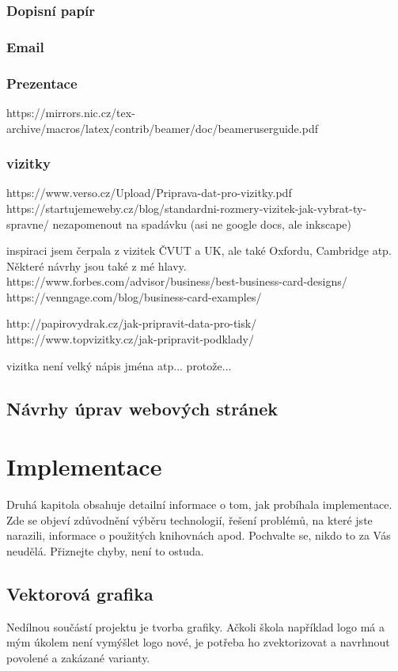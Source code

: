 \documentclass[11pt,a4paper,twoside,openright]{report}
\begin{document}
\subsection{Dopisní papír}
\subsection{Email}
\subsection{Prezentace}
https://mirrors.nic.cz/tex-archive/macros/latex/contrib/beamer/doc/beameruserguide.pdf
\subsection{vizitky}
https://www.verso.cz/Upload/Priprava-dat-pro-vizitky.pdf
https://startujemeweby.cz/blog/standardni-rozmery-vizitek-jak-vybrat-ty-spravne/
nezapomenout na spadávku (asi ne google docs, ale inkscape)

inspiraci jsem čerpala z vizitek ČVUT a UK, ale také Oxfordu, Cambridge atp. Některé návrhy jsou také z mé hlavy.
https://www.forbes.com/advisor/business/best-business-card-designs/
https://venngage.com/blog/business-card-examples/

http://papirovydrak.cz/jak-pripravit-data-pro-tisk/
https://www.topvizitky.cz/jak-pripravit-podklady/

vizitka není velký nápis jména atp... protože...
\section{Návrhy úprav webových stránek}



\chapter{Implementace}

Druhá kapitola obsahuje detailní informace o tom, jak probíhala implementace. Zde se objeví zdůvodnění výběru technologií, řešení problémů, na které jste narazili, informace o použitých knihovnách apod. Pochvalte se, nikdo to za Vás neudělá. Přiznejte chyby, není to ostuda.

\section{Vektorová grafika}
\label{sec:grafika}
Nedílnou součástí projektu je tvorba grafiky. Ačkoli škola například logo má a mým úkolem není vymýšlet logo nové, je potřeba ho zvektorizovat a navrhnout povolené a zakázané varianty. 
\end{document}
